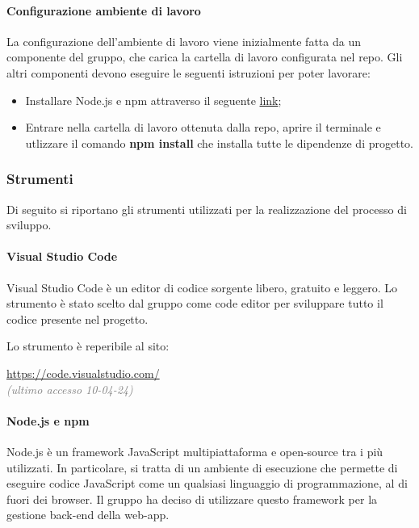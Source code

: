 \paragraph{Configurazione ambiente di lavoro}\label{sec:codifica:config}
La configurazione dell’ambiente di lavoro viene inizialmente fatta da un componente del gruppo, che carica la cartella di lavoro configurata nel repo.  Gli altri componenti devono eseguire le seguenti istruzioni per poter lavorare:
\begin{itemize}
    \item Installare Node.js e npm attraverso il seguente \href{https://nodejs.org/en/download}{link};
    \item Entrare nella cartella di lavoro ottenuta dalla repo, aprire il terminale e utlizzare il comando \textbf{npm install} che installa tutte le dipendenze di progetto.
\end{itemize}

\subsubsection{Strumenti}\label{sec:sviluppo:strumenti}
Di seguito si riportano gli strumenti utilizzati per la realizzazione del processo di sviluppo.

\paragraph{Visual Studio Code}
Visual Studio Code è un editor di codice sorgente libero, gratuito e leggero. Lo strumento è stato scelto dal gruppo come code editor per sviluppare tutto il codice presente nel progetto.
\par Lo strumento è reperibile al sito:
\begin{center}
    \url{https://code.visualstudio.com/}\\ \textcolor{gray}{\textit{(ultimo accesso 10-04-24)}}
\end{center}

\paragraph{Node.js e npm}
Node.js è un framework JavaScript multipiattaforma e open-source tra i più utilizzati. In particolare, si tratta di un ambiente di esecuzione che permette di eseguire codice JavaScript come un qualsiasi linguaggio di programmazione, al di fuori dei browser. Il gruppo ha deciso di utilizzare questo framework per la gestione back-end della web-app. 

